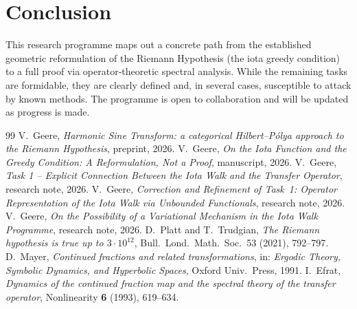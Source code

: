 \documentclass[11pt,a4paper]{article}
\begin{document}
\section{Conclusion}
This research programme maps out a concrete path from the established geometric reformulation of the Riemann Hypothesis (the iota greedy condition) to a full proof via operator‑theoretic spectral analysis.  While the remaining tasks are formidable, they are clearly defined and, in several cases, susceptible to attack by known methods.  The programme is open to collaboration and will be updated as progress is made.

\begin{thebibliography}{99}
 V.\ Geere, \emph{Harmonic Sine Transform: a categorical Hilbert--Pólya approach to the Riemann Hypothesis}, preprint, 2026.
 V.\ Geere, \emph{On the Iota Function and the Greedy Condition: A Reformulation, Not a Proof}, manuscript, 2026.
 V.\ Geere, \emph{Task 1 -- Explicit Connection Between the Iota Walk and the Transfer Operator}, research note, 2026.
 V.\ Geere, \emph{Correction and Refinement of Task~1: Operator Representation of the Iota Walk via Unbounded Functionals}, research note, 2026.
 V.\ Geere, \emph{On the Possibility of a Variational Mechanism in the Iota Walk Programme}, research note, 2026.
 D.\ Platt and T.\ Trudgian, \emph{The Riemann hypothesis is true up to $3\cdot10^{12}$}, Bull.\ Lond.\ Math.\ Soc.\ 53 (2021), 792–797.
 D.\ Mayer, \emph{Continued fractions and related transformations}, in: \textit{Ergodic Theory, Symbolic Dynamics, and Hyperbolic Spaces}, Oxford Univ.\ Press, 1991.
 I.\ Efrat, \emph{Dynamics of the continued fraction map and the spectral theory of the transfer operator}, Nonlinearity \textbf{6} (1993), 619--634.
\end{thebibliography}
\end{document}
